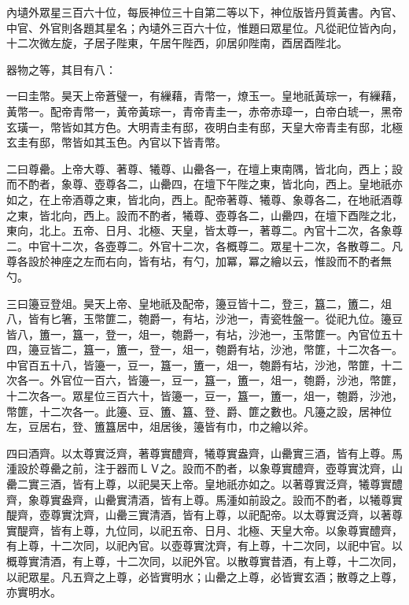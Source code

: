 \begin{pinyinscope}
 內壝外眾星三百六十位，每辰神位三十自第二等以下，神位版皆丹質黃書。內官、中官、外官則各題其星名；內壝外三百六十位，惟題曰眾星位。凡從祀位皆內向，十二次微左旋，子居子陛東，午居午陛西，卯居卯陛南，酉居酉陛北。



 器物之等，其目有八：



 一曰圭幣。昊天上帝蒼璧一，有繅藉，青幣一，燎玉一。皇地祇黃琮一，有繅藉，黃幣一。配帝青幣一，黃帝黃琮一，青帝青圭一，赤帝赤璋一，白帝白琥一，黑帝玄璜一，幣皆如其方色。大明青圭有邸，夜明白圭有邸，天皇大帝青圭有邸，北極玄圭有邸，幣皆如其玉色。內官以下皆青幣。



 二曰尊罍。上帝大尊、著尊、犧尊、山罍各一，在壇上東南隅，皆北向，西上；設而不酌者，象尊、壺尊各二，山罍四，在壇下午陛之東，皆北向，西上。皇地祇亦如之，在上帝酒尊之東，皆北向，西上。配帝著尊、犧尊、象尊各二，在地祇酒尊之東，皆北向，西上。設而不酌者，犧尊、壺尊各二，山罍四，在壇下酉陛之北，東向，北上。五帝、日月、北極、天皇，皆太尊一，著尊二。內官十二次，各象尊二。中官十二次，各壺尊二。外官十二次，各概尊二。眾星十二次，各散尊二。凡尊各設於神座之左而右向，皆有坫，有勺，加冪，冪之繪以云，惟設而不酌者無勺。



 三曰籩豆登俎。昊天上帝、皇地祇及配帝，籩豆皆十二，登三，簋二，簠二，俎八，皆有匕箸，玉幣篚二，匏爵一，有坫，沙池一，青瓷牲盤一。從祀九位。籩豆皆八，簠一，簋一，登一，俎一，匏爵一，有坫，沙池一，玉幣篚一。內官位五十四，籩豆皆二，簋一，簠一，登一，俎一，匏爵有坫，沙池，幣篚，十二次各一。中官百五十八，皆籩一，豆一，簋一，簠一，俎一，匏爵有坫，沙池，幣篚，十二次各一。外官位一百六，皆籩一，豆一，簋一，簠一，俎一，匏爵，沙池，幣篚，十二次各一。眾星位三百六十，皆籩一，豆一，簋一，簠一，俎一，匏爵，沙池，幣篚，十二次各一。此籩、豆、簠、簋、登、爵、篚之數也。凡籩之設，居神位左，豆居右，登、簠簋居中，俎居後，籩皆有巾，巾之繪以斧。



 四曰酒齊。以太尊實泛齊，著尊實醴齊，犧尊實盎齊，山罍實三酒，皆有上尊。馬湩設於尊罍之前，注于器而ＬＶ之。設而不酌者，以象尊實醴齊，壺尊實沈齊，山罍二實三酒，皆有上尊，以祀昊天上帝。皇地祇亦如之。以著尊實泛齊，犧尊實醴齊，象尊實盎齊，山罍實清酒，皆有上尊。馬湩如前設之。設而不酌者，以犧尊實醍齊，壺尊實沈齊，山罍三實清酒，皆有上尊，以祀配帝。以太尊實泛齊，以著尊實醍齊，皆有上尊，九位同，以祀五帝、日月、北極、天皇大帝。以象尊實醴齊，有上尊，十二次同，以祀內官。以壺尊實沈齊，有上尊，十二次同，以祀中官。以概尊實清酒，有上尊，十二次同，以祀外官。以散尊實昔酒，有上尊，十二次同，以祀眾星。凡五齊之上尊，必皆實明水；山罍之上尊，必皆實玄酒；散尊之上尊，亦實明水。




\end{pinyinscope}
